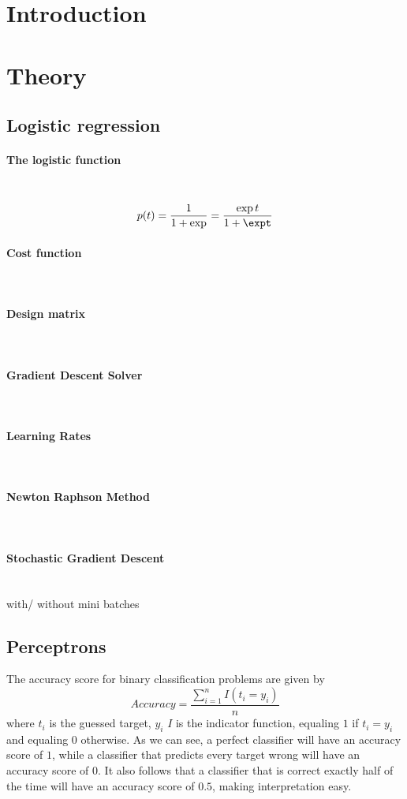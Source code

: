 \documentclass[10pt, a4paper, twocolumn]{article}
\newcommand{\myparagraph}[1]{\paragraph{#1}\mbox{}\\}
\begin{document}

\twocolumn[
  \begin{@twocolumnfalse}
    \maketitle
    \begin{abstract}
      \abstractText
      \newline
      \newline
    \end{abstract}
  \end{@twocolumnfalse}
]


\section{Introduction}
\section{Theory}
	\subsection{Logistic regression}
		\myparagraph{The logistic function}
			$$p(t) = \frac{1}{1+\exp}=\frac{\exp t}{1+\expt}$$
		\myparagraph{Cost function}
		\myparagraph{Design matrix}
		\myparagraph{Gradient Descent Solver}
		\myparagraph{Learning Rates}
		\myparagraph{Newton Raphson Method}
		
		\myparagraph{Stochastic Gradient Descent}
			with/ without mini batches
		
	\subsection{Perceptrons}
	
	The accuracy score for binary classification problems are given by
		$$Accuracy=\frac{\sum_{i=1}^nI(t_i=y_i)}{n}$$
	where $t_i$ is the guessed target, $y_i$ $I$ is the indicator function, equaling $1$ if $t_i=y_i$ and equaling $0$ otherwise.
	As we can see, a perfect classifier will have an accuracy score of $1$, while a classifier that predicts every target wrong will have an accuracy score of $0$. It also follows that a classifier that is correct exactly half of the time will have an accuracy score of $0.5$, making interpretation easy.
\end{document}
